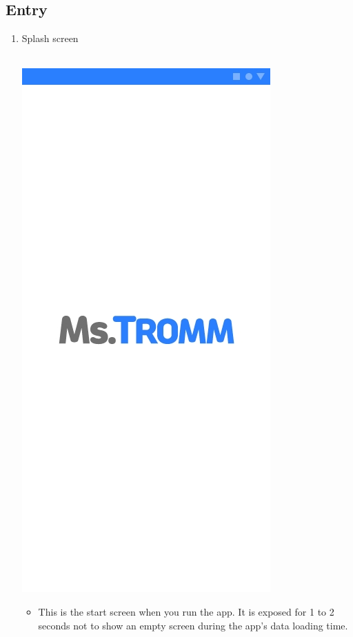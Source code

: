 \documentclass[conference]{IEEEtran}
\begin{document}
\subsection{Entry \\}
\begin{enumerate}
    \item Splash screen \\\\
    \centerline{\includegraphics[scale=0.32]{1. 스플래쉬 화면.jpg}}
    \begin{itemize}
    \item[] This is the start screen when you run the app. It is exposed for 1 to 2 seconds not to show an empty screen during the app's data loading time. \\ \\ \\ \\

\end{itemize}
\end{enumerate}
\end{document}
